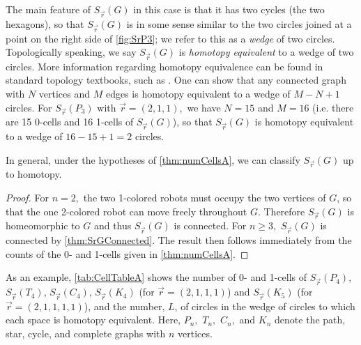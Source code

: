 \documentclass{amsart}
\newcommand{\Sr}{S_{\vec{r}}}
\newcommand{\Z}{\mathbb{Z}}
\newcommand{\vertex}[3][1]{
\node [circle,  fill, inner sep = 0pt,outer sep = 0pt, minimum size=#1mm] (#3) at #2 {};
}
\newtheorem{cor}[thm]{Corollary}
\theoremstyle{definition}
\theoremstyle{remark}
\begin{document}
    The main feature of $\Sr(G)$ in this case is that it has two cycles (the two hexagons), so that $\Sr(G)$ is in some sense similar to the two circles joined at a point on the right side of \cref{fig:SrP3}; we refer to this as a \textit{wedge} of two circles. Topologically speaking, we say $\Sr(G)$ is \textit{homotopy equivalent} to a wedge of two circles. More information regarding homotopy equivalence can be found in standard topology textbooks, such as \cite{Munkres_2000}. One can show that any connected graph with $N$ vertices and $M$ edges is homotopy equivalent to a wedge of $M-N+1$ circles. For $\Sr(P_3)$ with $\vec r=(2,1,1),$ we have $N=15$ and $M=16$ (i.e. there are 15 0-cells and 16 1-cells of $\Sr(G)$), so that $\Sr(G)$ is homotopy equivalent to a wedge of $16-15+1=2$ circles.

    In general, under the hypotheses of \cref{thm:numCellsA}, we can classify $\Sr(G)$ up to homotopy.

    \begin{proof}
        For $n=2,$ the two 1-colored robots must occupy the two vertices of $G$, so that the one 2-colored robot can move freely throughout $G$. Therefore $\Sr(G)$ is homeomorphic to $G$ and thus $\Sr(G)$ is connected. For $n\ge 3,$ $\Sr(G)$ is connected by \cref{thm:SrGConnected}. The result then follows immediately from the counts of the 0- and 1-cells given in \cref{thm:numCellsA}.
    \end{proof}


As an example, \cref{tab:CellTableA} shows the number of 0- and 1-cells of $\Sr(P_4)$, $\Sr(T_4)$, $\Sr(C_4)$, $\Sr(K_4)$ (for $\vec r = (2,1,1,1)$) and $\Sr(K_5)$ (for $\vec r = (2,1,1,1,1)$), and the number, $L$, of circles in the wedge of circles to which each space is homotopy equivalent. Here, $P_n,$ $T_n,$ $C_n,$ and $K_n$ denote the path, star, cycle, and complete graphs with $n$ vertices.
 
\newsavebox{\GraphAa}
\savebox{\GraphAa}{
\begin{tikzpicture}[scale=0.35]
    \vertex{(0,0)}{a}
    \vertex{(1,0)}{b}
    \vertex{(2,0)}{c}
    \vertex{(3,0)}{d}
    \draw (a)--(d);
\end{tikzpicture}
}
\end{document}
